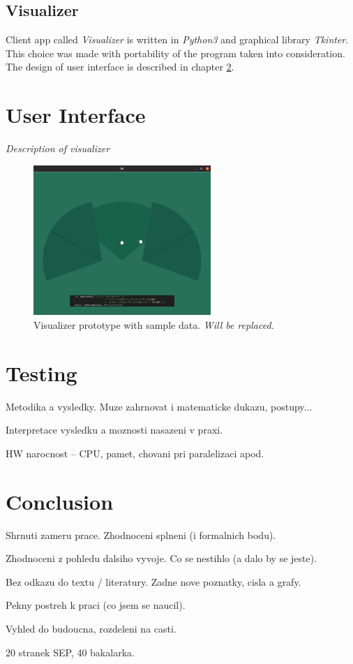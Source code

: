 \section{Visualizer}
Client app called {\it Visualizer} is written in {\it Python3} and graphical library {\it Tkinter}.
This choice was made with portability of the program taken into consideration.
The design of user interface is described in chapter \ref{Label:UI}.






\chapter{User Interface}
\label{Label:UI}

{\it Description of visualizer}

\begin{figure}[h!]
\begin{center}
\includegraphics[width=0.6\textwidth]{obrazky-figures/visualizer.png}
\caption{Visualizer prototype with sample data. {\it Will be replaced.} \label{fig:visualizer}}
\end{center}
\end{figure}


\chapter{Testing}
Metodika a vysledky. Muze zahrnovat i matematicke dukazu, postupy...

Interpretace vysledku a moznosti nasazeni v praxi.

HW narocnost -- CPU, pamet, chovani pri paralelizaci apod.




\chapter{Conclusion}
Shrnuti zameru prace. Zhodnoceni splneni (i formalnich bodu).

Zhodnoceni z pohledu dalsiho vyvoje. Co se nestihlo (a dalo by se jeste).

Bez odkazu do textu / literatury. Zadne nove poznatky, cisla a grafy.

Pekny postreh k praci (co jsem se naucil).

Vyhled do budoucna, rozdeleni na casti.

20 stranek SEP, 40 bakalarka.




